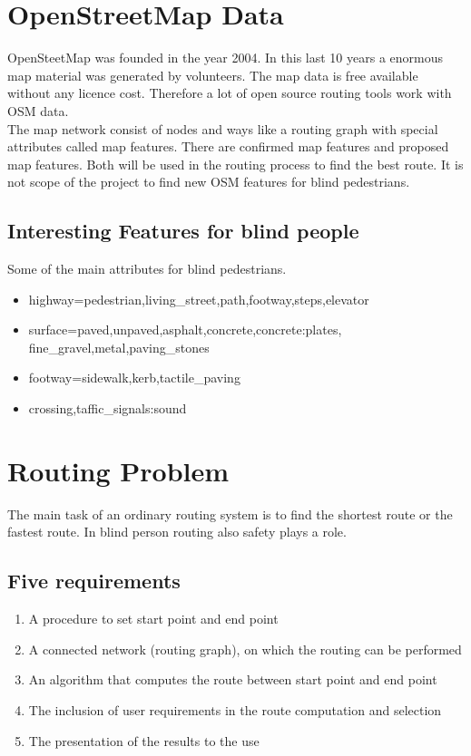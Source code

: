 \documentclass{sig-alternate}
\begin{document}
\section{OpenStreetMap Data}
OpenSteetMap was founded in the year 2004. In this last 10 years a enormous map material was generated by volunteers. The map data is free available without any licence cost. Therefore a lot of open source routing tools work with OSM data. \\
The map network consist of nodes and ways like a routing graph with special attributes called map features. There are confirmed map features and proposed map features.  Both will be used in the routing process to find the best route. It is not scope of the project to find new OSM features for blind pedestrians.   

\subsection{Interesting Features for blind people}
Some of the main attributes for blind pedestrians.
\begin{itemize}
  \item highway=pedestrian,living\_street,path,footway,steps,elevator
  \item surface=paved,unpaved,asphalt,concrete,concrete:plates, \\ fine\_gravel,metal,paving\_stones
  \item footway=sidewalk,kerb,tactile\_paving
  \item crossing,taffic\_signals:sound  
\end{itemize}

\section{Routing Problem}
The main task of an ordinary routing system is to find the shortest route or the fastest route. In blind person routing also safety plays a role.
\subsection{Five requirements\cite{weyrer}}
\begin{enumerate}
  \item A procedure to set start point and end point
  \item A connected network (routing graph), on which the routing can be performed
  \item An algorithm that computes the route between start point and end point
  \item The inclusion of user requirements in the route computation and selection
  \item The presentation of the results to the use
\end{enumerate}
\end{document}
